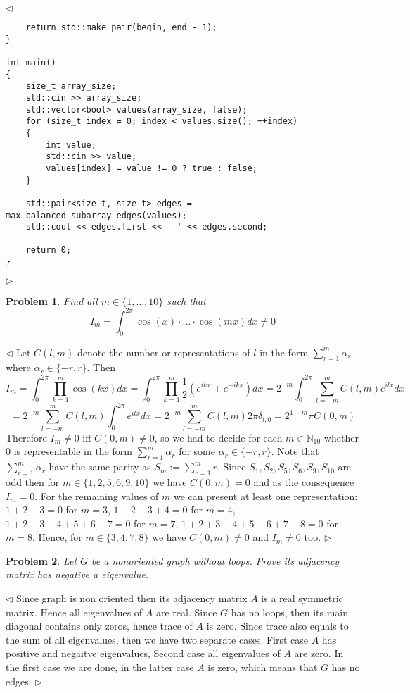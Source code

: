 \documentclass[12pt]{article}
\newtheorem{problem}{Problem}[subsection]
\newenvironment{solution}{\par $\triangleleft$}{$\triangleright$}
\begin{document}
\begin{solution}
\begin{verbatim}
    return std::make_pair(begin, end - 1);
}

int main()
{
    size_t array_size;
    std::cin >> array_size;
    std::vector<bool> values(array_size, false);
    for (size_t index = 0; index < values.size(); ++index)
    {
        int value;
        std::cin >> value;
        values[index] = value != 0 ? true : false;
    }

    std::pair<size_t, size_t> edges = max_balanced_subarray_edges(values);
    std::cout << edges.first << ' ' << edges.second;

    return 0;
}
    \end{verbatim}
\end{solution}

\begin{problem} Find all $m\in \{1,\ldots,10\}$ such that
$$
    I_m=\int_0^{2\pi} \cos(x)\cdot
    \ldots
    \cdot\cos(mx)dx\neq 0
$$
\end{problem}
\begin{solution} Let $C(l,m)$ denote the number or representations of $l$ in the
    form $\sum_{r=1}^m\alpha_r$ where $\alpha_r\in \{-r,r\}$. Then
    $$
        I_m=\int_0^{2\pi}\prod_{k=1}^m\cos(kx)dx
        =\int_0^{2\pi}\prod_{k=1}^m\frac{1}{2}(e^{ikx}+e^{-ikx})dx
        =2^{-m}\int_0^{2\pi}\sum_{l=-m}^m C(l,m) e^{ilx}dx
    $$
    $$
        =2^{-m}\sum_{l=-m}^m C(l,m)\int_0^{2\pi} e^{ilx}dx
            =2^{-m}\sum_{l=-m}^m C(l,m)2\pi \delta_{l,0}
        =2^{1-m}\pi C(0,m)
    $$
    Therefore $I_m\neq 0$ iff $C(0,m)\neq 0$, so we had to decide for each
    $m\in\mathbb{N}_{10}$ whether $0$ is representable in the form
    $\sum_{r=1}^m\alpha_r$ for some $\alpha_r\in \{-r,r\}$. Note that
    $\sum_{r=1}^m\alpha_r$ have the same parity as $S_m:=\sum_{r=1}^m r$. Since
    $S_1, S_2, S_5, S_6, S_9, S_{10}$ are odd then for $m\in \{1,2,5,6,9,10\}$
    we have $C(0,m)=0$ and as the consequence $I_m=0$. For the remaining values
    of $m$ we can present at least one representation: $1+2-3=0$ for $m=3$,
    $1-2-3+4=0$ for $m=4$, $1+2-3-4+5+6-7=0$ for $m=7$, $1+2+3-4+5-6+7-8=0$ for
    $m=8$. Hence, for $m\in \{3, 4, 7, 8\}$ we have $C(0,m)\neq 0$ and $I_m\neq
        0$ too.
\end{solution}

\begin{problem} Let $G$ be a nonoriented graph without loops. Prove its
adjacency matrix has negative a eigenvalue.
\end{problem}
\begin{solution} Since graph is non oriented then its adjacency matrix $A$ is a
    real symmetric matrix. Hence all eigenvalues of $A$ are real. Since $G$ has
    no loops, then its main diagonal contains only zeros, hence trace of $A$ is
    zero. Since trace also equals to the sum of all eigenvalues, then we have
    two separate cases. First case $A$ has positive and negaitve eigenvalues,
    Second case all eigenvalues of $A$ are zero. In the first case we are done,
    in the latter case $A$ is zero, which means that $G$ has no edges.
\end{solution}
\end{document}
